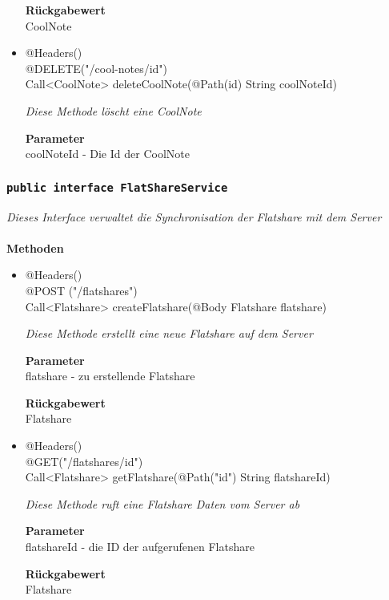 \begin{itemize}
        		\textbf{Rückgabewert} \\
                CoolNote
        	
            
              \item{@Headers() \\ @DELETE("/cool-notes/{id}")\\ Call<CoolNote> deleteCoolNote(@Path(\grqq id\grqq) String coolNoteId)}
        	
      	 	 	\textit{Diese Methode löscht eine CoolNote }
        	
        		\textbf{Parameter} \\
        		coolNoteId - Die Id der CoolNote 
        	
                                
       		 \end{itemize}
             
             
             	\subsubsection{\texttt{public interface  FlatShareService }}
        \textit{Dieses Interface verwaltet die Synchronisation der Flatshare mit dem Server}\\
        \\
		\textbf{Methoden} \\
 			\begin{itemize}
        		\item{@Headers()\\ @POST ("/flatshares") \\
   Call<Flatshare> createFlatshare(@Body Flatshare flatshare)
}
        	
        		\textit{Diese Methode erstellt eine neue Flatshare auf dem Server
}
        	
        		\textbf{Parameter} \\
                flatshare - zu erstellende Flatshare 
        		        	
       		 	\textbf{Rückgabewert} \\
                Flatshare
      		  	 
      	      \item{@Headers()\\  @GET("/flatshares/{id}")\\ Call<Flatshare> getFlatshare(@Path("id") 					String flatshareId)}
        	
      	 	 	\textit{Diese Methode ruft eine Flatshare Daten vom Server ab }
        	
        		\textbf{Parameter} \\
        		flatshareId - die ID der aufgerufenen Flatshare 
        	
        		\textbf{Rückgabewert} \\
                Flatshare
                      	
       	
       		 \end{itemize}
             

